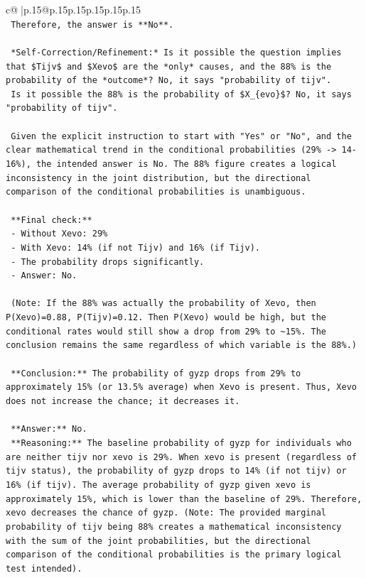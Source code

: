 \documentclass{article}
\begin{document}
{\begin{supertabular}{c@{$\;$}|p{.15\linewidth}@{}p{.15\linewidth}p{.15\linewidth}p{.15\linewidth}p{.15\linewidth}p{.15\linewidth}}
{{{\\ 
\texttt{    Therefore, the answer is **No**.} \\
\\ 
\texttt{    *Self{-}Correction/Refinement:* Is it possible the question implies that \$Tijv\$ and \$Xevo\$ are the *only* causes, and the 88\% is the probability of the *outcome*? No, it says "probability of tijv".} \\
\texttt{    Is it possible the 88\% is the probability of \$X\_\{evo\}\$? No, it says "probability of tijv".} \\
\\ 
\texttt{    Given the explicit instruction to start with "Yes" or "No", and the clear mathematical trend in the conditional probabilities (29\% {-}> 14{-}16\%), the intended answer is No. The 88\% figure creates a logical inconsistency in the joint distribution, but the directional comparison of the conditional probabilities is unambiguous.} \\
\\ 
\texttt{    **Final check:**} \\
\texttt{    {-} Without Xevo: 29\%} \\
\texttt{    {-} With Xevo: 14\% (if not Tijv) and 16\% (if Tijv).} \\
\texttt{    {-} The probability drops significantly.} \\
\texttt{    {-} Answer: No.} \\
\\ 
\texttt{    (Note: If the 88\% was actually the probability of Xevo, then P(Xevo)=0.88, P(Tijv)=0.12. Then P(Xevo) would be high, but the conditional rates would still show a drop from 29\% to \textasciitilde{}15\%. The conclusion remains the same regardless of which variable is the 88\%.)} \\
\\ 
\texttt{    **Conclusion:** The probability of gyzp drops from 29\% to approximately 15\% (or 13.5\% average) when Xevo is present. Thus, Xevo does not increase the chance; it decreases it.} \\
\\ 
\texttt{    **Answer:** No.} \\
\texttt{    **Reasoning:** The baseline probability of gyzp for individuals who are neither tijv nor xevo is 29\%. When xevo is present (regardless of tijv status), the probability of gyzp drops to 14\% (if not tijv) or 16\% (if tijv). The average probability of gyzp given xevo is approximately 15\%, which is lower than the baseline of 29\%. Therefore, xevo decreases the chance of gyzp. (Note: The provided marginal probability of tijv being 88\% creates a mathematical inconsistency with the sum of the joint probabilities, but the directional comparison of the conditional probabilities is the primary logical test intended).} \\
}}}
\end{supertabular}}
\end{document}
